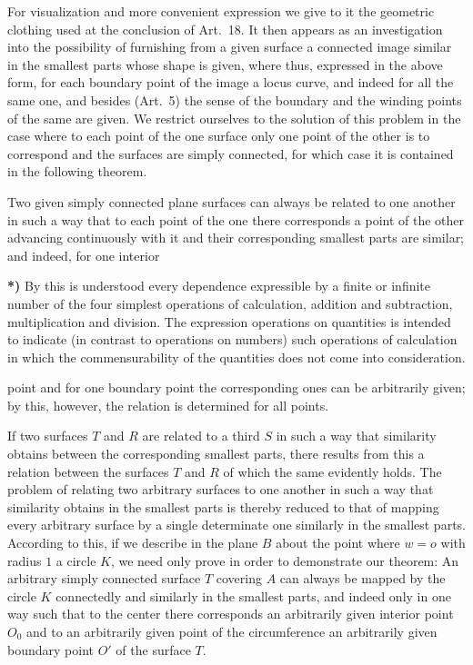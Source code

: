 \documentclass{article}
\begin{document}
For visualization and more convenient expression we give to it the geometric clothing used at the conclusion of Art.~18. It then appears as an investigation into the possibility of furnishing from a given surface a connected image similar in the smallest parts whose shape is given, where thus, expressed in the above form, for each boundary point of the image a locus curve, and indeed for all the same one, and besides (Art.~5) the sense of the boundary and the winding points of the same are given. We restrict ourselves to the solution of this problem in the case where to each point of the one surface only one point of the other is to correspond and the surfaces are simply connected, for which case it is contained in the following theorem.

Two given simply connected plane surfaces can always be related to one another in such a way that to each point of the one there corresponds a point of the other advancing continuously with it and their corresponding smallest parts are similar; and indeed, for one interior

\textbf{*)} By this is understood every dependence expressible by a finite or infinite number of the four simplest operations of calculation, addition and subtraction, multiplication and division. The expression operations on quantities is intended to indicate (in contrast to operations on numbers) such operations of calculation in which the commensurability of the quantities does not come into consideration.

point and for one boundary point the corresponding ones can be arbitrarily given; by this, however, the relation is determined for all points.

If two surfaces $T$ and $R$ are related to a third $S$ in such a way that similarity obtains between the corresponding smallest parts, there results from this a relation between the surfaces $T$ and $R$ of which the same evidently holds. The problem of relating two arbitrary surfaces to one another in such a way that similarity obtains in the smallest parts is thereby reduced to that of mapping every arbitrary surface by a single determinate one similarly in the smallest parts. According to this, if we describe in the plane $B$ about the point where $w = o$ with radius $1$ a circle $K$, we need only prove in order to demonstrate our theorem: An arbitrary simply connected surface $T$ covering $A$ can always be mapped by the circle $K$ connectedly and similarly in the smallest parts, and indeed only in one way such that to the center there corresponds an arbitrarily given interior point $O_0$ and to an arbitrarily given point of the circumference an arbitrarily given boundary point $O'$ of the surface $T$.
\end{document}
